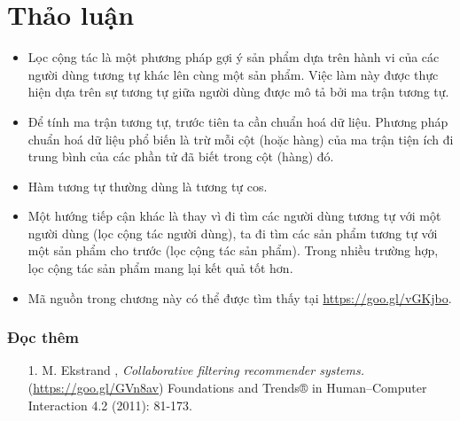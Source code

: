  
\section{Thảo luận}
\label{sec:24_discuss}
\begin{itemize}
    \item Lọc cộng tác là một phương pháp gợi ý sản phẩm dựa trên hành vi của các người dùng tương tự khác lên cùng một
    sản phẩm. Việc làm này được thực hiện dựa trên sự tương tự giữa người dùng được mô tả bởi ma trận tương tự.
 
    \item Để tính ma trận tương tự, trước tiên ta cần chuẩn hoá dữ
    liệu. Phương pháp chuẩn hoá dữ liệu phổ biến là trừ mỗi cột (hoặc hàng) của ma trận tiện ích đi trung bình của các phần tử đã biết trong cột (hàng) đó. 
 
    \item Hàm tương tự thường dùng là tương tự cos. 
 
    \item Một hướng tiếp cận khác là thay vì đi tìm các người dùng tương tự với một người dùng (lọc cộng tác người dùng), ta đi tìm các sản phẩm tương tự
    với một sản phẩm cho trước (lọc cộng tác sản phẩm). Trong nhiều trường hợp, lọc cộng tác sản phẩm mang lại kết quả tốt hơn. 


    \item Mã nguồn trong chương này có thể được tìm thấy tại \url{https://goo.gl/vGKjbo}.
\end{itemize}
 
 
\subsubsection{Đọc thêm}
\begin{enumerate}
    \item[1.] M. Ekstrand \etal, \textit{Collaborative filtering recommender systems.}
    (\url{https://goo.gl/GVn8av}) Foundations and Trends® in Human–Computer Interaction 4.2 (2011): 81-173.
\end{enumerate} 
 
